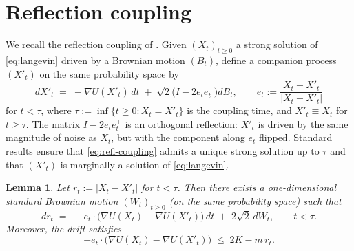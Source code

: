 \documentclass[11pt]{article}
\newtheorem{lemma}[theorem]{Lemma}
\theoremstyle{definition}
\newcommand{\abs}[1]{\left\lvert #1 \right\rvert}
\begin{document}
\section{Reflection coupling}\label{sec:reflection}

We recall the reflection coupling of \cite{LindvallRogers1986,Eberle2016}. Given $(X_t)_{t\ge 0}$ a strong solution of \eqref{eq:langevin} driven by a Brownian motion $(B_t)$, define a companion process $(X'_t)$ on the same probability space by
\begin{equation}\label{eq:refl-coupling}
dX'_t \;=\; -\nabla U(X'_t)\,dt \;+\; \sqrt{2}\bigl(I - 2 e_t e_t^\top\bigr) dB_t, \qquad e_t := \frac{X_t - X'_t}{\abs{X_t - X'_t}}
\end{equation}
for $t < \tau$, where $\tau := \inf\{t \ge 0 : X_t = X'_t\}$ is the coupling time, and $X'_t \equiv X_t$ for $t \ge \tau$. The matrix $I - 2 e_t e_t^\top$ is an orthogonal reflection: $X'_t$ is driven by the same magnitude of noise as $X_t$, but with the component along $e_t$ flipped. Standard results \cite{LindvallRogers1986} ensure that \eqref{eq:refl-coupling} admits a unique strong solution up to $\tau$ and that $(X'_t)$ is marginally a solution of \eqref{eq:langevin}.

\begin{lemma}\label{lem:rt-sde}
Let $r_t := \abs{X_t - X'_t}$ for $t < \tau$. Then there exists a one-dimensional standard Brownian motion $(W_t)_{t\ge 0}$ (on the same probability space) such that
\begin{equation}\label{eq:rt-sde}
dr_t \;=\; -e_t \cdot \bigl(\nabla U(X_t) - \nabla U(X'_t)\bigr)\,dt \;+\; 2\sqrt{2}\,dW_t, \qquad t < \tau.
\end{equation}
Moreover, the drift satisfies
\begin{equation}\label{eq:drift-bound}
-e_t \cdot \bigl(\nabla U(X_t) - \nabla U(X'_t)\bigr) \;\le\; 2K - m\,r_t.
\end{equation}
\end{lemma}
\end{document}
